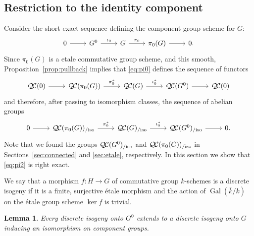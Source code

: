 \documentclass{amsart}
\theoremstyle{plain}
\newtheorem{lemma}[theorem]{Lemma}
\theoremstyle{definition}
\theoremstyle{remark}
\newcommand{\bFq}{\bar{k}}
\newcommand{\Fq}{k}
\DeclareMathOperator{\Gal}{Gal}
\newcommand{\QC}{{\mathcal{Q\hskip-0.8pt C}}}
\newcommand{\QCiso}[1]{\QC(#1)_{/\text{iso}}}
\begin{document}
\subsection{Restriction to the identity component} \label{sec:restriction}

Consider the short exact sequence
defining the component group scheme for $G$:
\begin{equation}\label{eq:pi0}
\begin{tikzcd}
0 \rar & G^0 \arrow{r}{\iota_0} & G \arrow{r}{\pi_0} & \pi_0(G) \rar & 0.
\end{tikzcd}
\end{equation}
Since $\pi_0(G)$ is a etale commutative group scheme, and this smooth,
Proposition~\ref{prop:pullback} implies that \eqref{eq:pi0} defines the sequence of functors
\begin{equation}\label{eq:pi1}
\begin{tikzcd}
\QC(0) \rar & \QC(\pi_0(G)) \arrow{r}{\pi_0^*} & \QC(G) \arrow{r}{\iota_0^*} & \QC(G^0) \rar & \QC(0)
\end{tikzcd}
\end{equation}
and therefore, after passing to isomorphism classes, the sequence of abelian groups
\begin{equation}\label{eq:pi2}
\begin{tikzcd}
0 \rar &
\QCiso{\pi_0(G)} \arrow{r}{\pi_0^*} & \QCiso{G} \arrow{r}{\iota_0^*} & \QCiso{G^0} \rar & 0.
\end{tikzcd}
\end{equation}
 Note that we found the groups $\QCiso{G^0}$
and $\QCiso{\pi_0(G)}$
in Sections~\ref{sec:connected} and \ref{sec:etale}, respectively.
In this section we show that \eqref{eq:pi2} is right exact.

We say that a morphism $f : H\to G$ of commutative group $\Fq$-schemes is a discrete isogeny if it is a finite, surjective \'etale morphism and
the action of $\Gal(\bFq/\Fq)$ on the \'etale group scheme $\ker f$ is trivial.

\begin{lemma}\label{lemma:ext}
Every discrete isogeny onto $G^0$ extends to a discrete
isogeny onto $G$ inducing an isomorphism on component groups.
\end{lemma}
\end{document}
